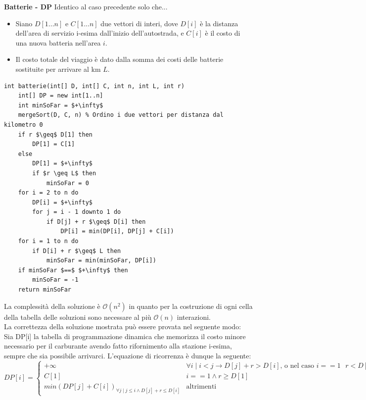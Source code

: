 \documentclass[../cheatSheetAlgoritmi.tex]{subfiles}
\begin{document}
\textbf{Batterie - DP}
Identico al caso precedente solo che...\\
\begin{itemize}
	\item Siano $D[1...n]$ e $C[1...n]$ due vettori di interi, dove $D[i]$ è la distanza dell'area di servizio i-esima dall’inizio dell’autostrada, e $C[i]$ è il costo di una nuova batteria nell'area $i$.
	\item Il costo totale del viaggio è dato dalla somma dei costi delle batterie sostituite per arrivare al km $L$.
\end{itemize}
\begin{lstlisting}[caption=Batterie DP]
int batterie(int[] D, int[] C, int n, int L, int r)
    int[] DP = new int[1..n]
    int minSoFar = $+\infty$
    mergeSort(D, C, n) % Ordino i due vettori per distanza dal kilometro 0
    if r $\geq$ D[1] then
        DP[1] = C[1]
    else
        DP[1] = $+\infty$
        if $r \geq L$ then
            minSoFar = 0
    for i = 2 to n do
        DP[i] = $+\infty$
        for j = i - 1 downto 1 do
            if D[j] + r $\geq$ D[i] then
                DP[i] = min(DP[i], DP[j] + C[i])
    for i = 1 to n do
        if D[i] + r $\geq$ L then
            minSoFar = min(minSoFar, DP[i])
    if minSoFar $==$ $+\infty$ then
        minSoFar = -1
    return minSoFar
\end{lstlisting}
La complessità della soluzione è $\mathcal{O}(n^2)$ in quanto per la costruzione di ogni cella della tabella delle soluzioni sono necessare al più $\mathcal{O}(n)$ interazioni. \\
La correttezza della soluzione mostrata può essere provata nel seguente modo: \\
Sia DP[i] la tabella di programmazione dinamica che memorizza il costo minore necessario per il carburante avendo fatto rifornimento alla stazione i-esima, sempre che sia possibile arrivarci. L'equazione di ricorrenza è dunque la seguente:
\begin{equation*}
    DP[i]=\begin{cases}
        + \infty & \text{$\forall i \mid i < j \rightarrow D[j] + r > D[i]$, o nel caso $i == 1$ $r < D[1]$} \\
        C[1] & \text{$i == 1 \land r \geq D[1]$}\\
        min(DP[j] + C[i])_{\forall j \mid j \leq i \land D[j] + r \leq D[i]} & \text{altrimenti}
    \end{cases}
\end{equation*} \\
\end{document}
